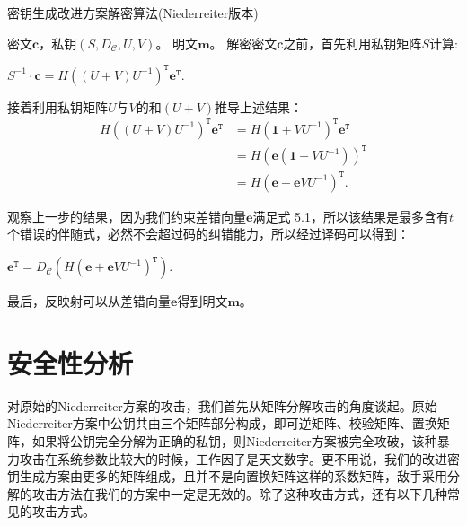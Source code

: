 \begin{breakablealgorithm}
	\small
	\renewcommand{\algorithmicrequire}{\textbf{Input:}}
	\renewcommand{\algorithmicensure}{\textbf{Output:}}
	\caption{密钥生成改进方案解密算法(Niederreiter版本)}
	\label{alg:NewDeN}
	\begin{algorithmic}[1]
		\Require
		密文$\mathbf{c}$，私钥$(S,D_\mathcal{C},U,V)$。
		\Ensure
		明文$\mathbf{m}$。
		\State
		解密密文$\mathbf{c}$之前，首先利用私钥矩阵$S$计算:
		\begin{center}
			$S^{-1} \cdot \textbf{c} = H((U + V)U^{-1})^\mathtt{T}\mathbf{e}^\mathtt{T}.$
		\end{center}
		\State
		接着利用私钥矩阵$U$与$V$的和$(U + V)$推导上述结果：
		\begin{equation}
		\begin{aligned}
		H((U + V)U^{-1})^\mathtt{T}\mathbf{e}^\mathtt{T} &= H(\mathbf{1} +VU^{-1})^\mathtt{T}\mathbf{e}^\mathtt{T} \\
		& = H(\mathbf{e}(\mathbf{1} +VU^{-1}))^\mathtt{T} \\
		& = H(\mathbf{e} + \mathbf{e}VU^{-1})^\mathtt{T}.
		\end{aligned}
		\end{equation}
		
		\State
		观察上一步的结果，因为我们约束差错向量$\mathbf{e}$满足式 5.1，所以该结果是最多含有$t$个错误的伴随式，必然不会超过码的纠错能力，所以经过译码可以得到：
		\begin{center}
			$\mathbf{e} ^ \mathtt{T} = D_\mathcal{C}(H(\mathbf{e} + \mathbf{e}VU^{-1})^\mathtt{T}).$
		\end{center}
		
		\State
		最后，反映射可以从差错向量$\mathbf{e}$得到明文$\mathbf{m}$。		
	\end{algorithmic}
\end{breakablealgorithm}

\section{安全性分析}
对原始的Niederreiter方案的攻击，我们首先从矩阵分解攻击的角度谈起。原始Niederreiter方案中公钥共由三个矩阵部分构成，即可逆矩阵、校验矩阵、置换矩阵，如果将公钥完全分解为正确的私钥，则Niederreiter方案被完全攻破，该种暴力攻击在系统参数比较大的时候，工作因子是天文数字。更不用说，我们的改进密钥生成方案由更多的矩阵组成，且并不是向置换矩阵这样的系数矩阵，敌手采用分解的攻击方法在我们的方案中一定是无效的。除了这种攻击方式，还有以下几种常见的攻击方式。

